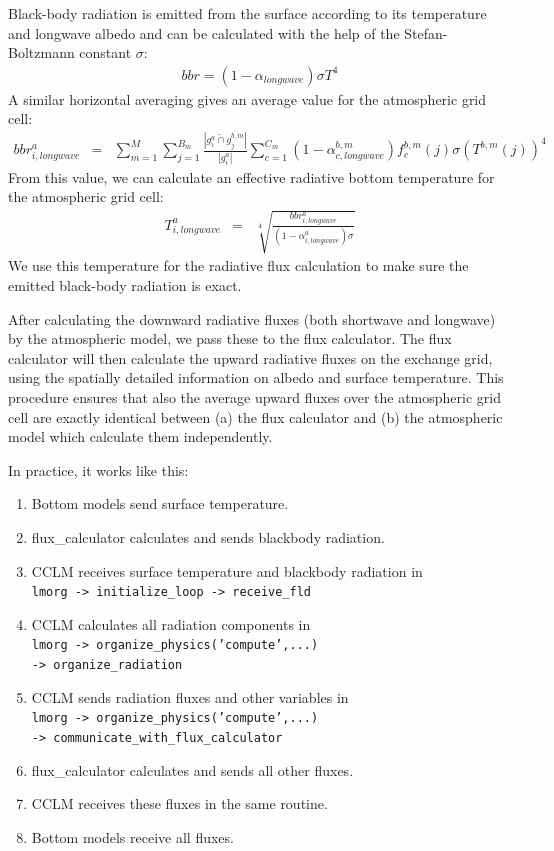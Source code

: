 \documentclass[a4paper,titlepage]{scrartcl}
\begin{document}
Black-body radiation is emitted from the surface according to its temperature and longwave albedo and can be calculated with the help of the Stefan-Boltzmann constant $\sigma$:
\begin{eqnarray}
  bbr = (1-\alpha_{longwave}) \sigma T^4
\end{eqnarray}
A similar horizontal averaging gives an average value for the atmospheric grid cell:
\begin{eqnarray}
  bbr^a_{i,longwave} &=& \sum\limits_{m=1}^M \sum\limits_{j=1}^{B_m} \frac{\left| g^a_i \tilde{\cap} g^{b,m}_j \right|}{\left| g^a_i \right|} \sum\limits_{c=1}^{C_m} \left(1-\alpha^{b,m}_{c,longwave} \right) f^{b,m}_c(j) \sigma \left(T^{b,m}(j)\right)^4 
\end{eqnarray}
From this value, we can calculate an effective radiative bottom temperature for the atmospheric grid cell:
\begin{eqnarray}
  T^a_{i,longwave} &=& \sqrt[4]{\frac{bbr^a_{i,longwave}}{(1-\alpha^a_{i,longwave}) \sigma}}
\end{eqnarray}
We use this temperature for the radiative flux calculation to make sure the emitted black-body radiation is exact.

After calculating the downward radiative fluxes (both shortwave and longwave) by the atmospheric model, we pass these to the flux calculator. The flux calculator will then calculate the upward radiative fluxes on the exchange grid, using the spatially detailed information on albedo and surface temperature. This procedure ensures that also the average upward fluxes over the atmospheric grid cell are exactly identical between (a) the flux calculator and (b) the atmospheric model which calculate them independently.

In practice, it works like this:
\begin{enumerate}
  \item Bottom models send surface temperature.
	\item flux\_calculator calculates and sends blackbody radiation.
  \item CCLM receives surface temperature and blackbody radiation in \\
        \texttt{lmorg -> initialize\_loop -> receive\_fld}
  \item CCLM calculates all radiation components in \\
        \texttt{lmorg -> organize\_physics('compute',...) \\-> organize\_radiation}
  \item CCLM sends radiation fluxes and other variables in \\
	      \texttt{lmorg -> organize\_physics('compute',...) \\-> communicate\_with\_flux\_calculator}
	\item flux\_calculator calculates and sends all other fluxes.
	\item CCLM receives these fluxes in the same routine.
	\item Bottom models receive all fluxes.
\end{enumerate}
\end{document}
